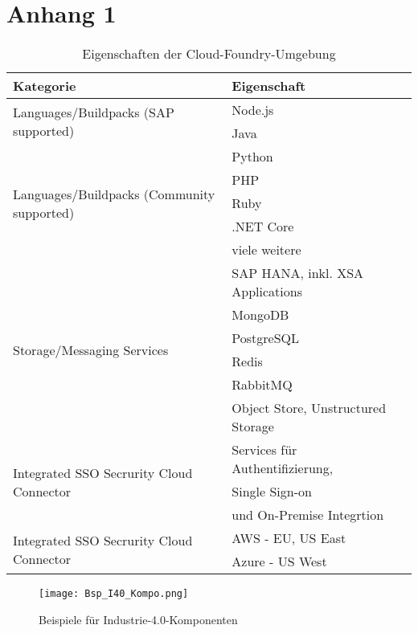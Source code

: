   \section{Anhang 1}

  \begin{table}[h]
    \begin{tabular}{lll}
      \toprule
      Kategorie & Eigenschaft\\
      \midrule
      \multirow[t]{2}{*}{Languages/Buildpacks (SAP supported)} & Node.js  \\
       & Java \\
       \multirow[t]{5}{*}{Languages/Buildpacks (Community supported)} & Python \\
       & PHP \\
       & Ruby \\
       & .NET Core \\
       & viele weitere \\
       \multirow[t]{6}{*}{Storage/Messaging Services} & SAP HANA, inkl. XSA Applications \\
       & MongoDB \\
       & PostgreSQL \\
       & Redis \\
       & RabbitMQ \\
       & Object Store, Unstructured Storage \\
       \multirow[t]{3}{*}{Integrated SSO Secrurity Cloud Connector} & Services für Authentifizierung,\\
       & Single Sign-on \\
       & und On-Premise Integrtion \\
       \multirow[t]{3}{*}{Integrated SSO Secrurity Cloud Connector} & AWS - EU, US East\\
       & Azure - US West  \\
      \bottomrule
      \end{tabular}
      \label{cf_table}
    \caption[Eigenschaften der Cloud-Foundry-Umgebung]{Eigenschaften der Cloud-Foundry-Umgebung \citep[S. 195]{Utecht2018}}
  \end{table}


  \newpage



\begin{figure}[h]
  \centering
  \texttt{[image: Bsp\_I40\_Kompo.png]}
  \caption[Beispiele für Industrie-4.0-Komponenten]{Beispiele für Industrie-4.0-Komponenten \citep[S. 54]{BITKOM2015}}
  \label{i40kompo}
\end{figure}

